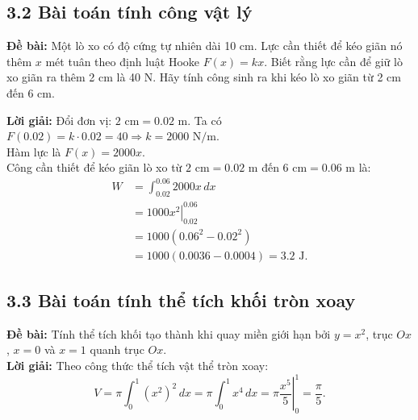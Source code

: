 \documentclass[12pt,a4paper]{article}
\begin{document}
\subsection{3.2 Bài toán tính công vật lý}
\textbf{Đề bài:} Một lò xo có độ cứng tự nhiên dài 10 cm. Lực cần thiết để kéo giãn nó thêm $x$ mét tuân theo định luật Hooke $F(x) = kx$. Biết rằng lực cần để giữ lò xo giãn ra thêm 2 cm là 40 N. Hãy tính công sinh ra khi kéo lò xo giãn từ 2 cm đến 6 cm. \\

\begin{center}
\end{center}
\textbf{Lời giải:}
Đổi đơn vị: $2 \text{ cm} = 0.02 \text{ m}$. Ta có $F(0.02) = k \cdot 0.02 = 40 \Rightarrow k = 2000 \text{ N/m}$. \\
Hàm lực là $F(x) = 2000x$. \\
Công cần thiết để kéo giãn lò xo từ $2 \text{ cm} = 0.02 \text{ m}$ đến $6 \text{ cm} = 0.06 \text{ m}$ là:
\begin{align*}
W&=\int_{0.02}^{0.06}2000x\,dx\\
 &=\left.1000x^2\right|_{0.02}^{0.06}\\
 &=1000(0.06^2-0.02^2)\\
 &=1000(0.0036-0.0004)=3.2\text{ J}.
\end{align*}


\subsection{3.3 Bài toán tính thể tích khối tròn xoay}
\textbf{Đề bài:} Tính thể tích khối tạo thành khi quay miền giới hạn bởi
$y=x^2$, trục $Ox$, $x=0$ và $x=1$ quanh trục $Ox$.\\
\textbf{Lời giải:}
Theo công thức thể tích vật thể tròn xoay:
\[
V=\pi\int_0^1(x^2)^2\,dx
=\pi\int_0^1x^4\,dx
=\pi\left.\frac{x^5}{5}\right|_0^1
=\frac{\pi}{5}.
\]
\end{document}
